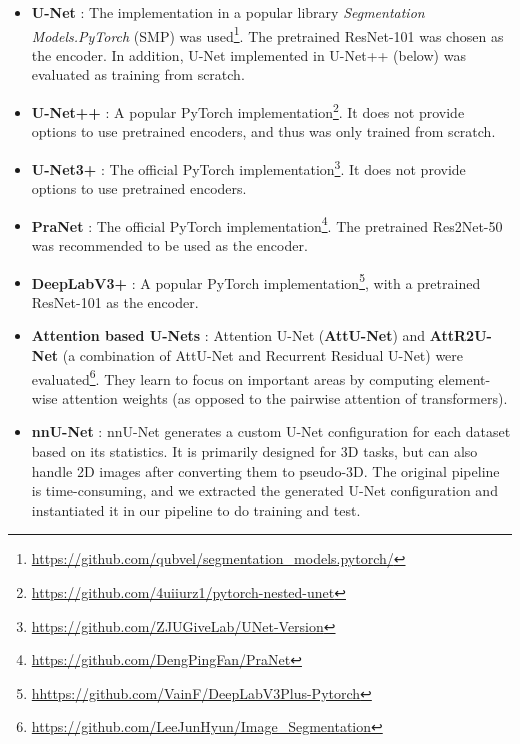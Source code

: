 \documentclass{article}
\begin{document}
\begin{itemize}
    \item \textbf{U-Net} \cite{unet}: The implementation in a popular library \emph{Segmentation Models.PyTorch} (SMP) was used\footnote{\url{https://github.com/qubvel/segmentation_models.pytorch/}}. The pretrained ResNet-101 was chosen as the encoder. In addition, U-Net implemented in U-Net++ (below) was evaluated as training from scratch. 
    
    \item \textbf{U-Net++} \cite{unet++}: A popular PyTorch implementation\footnote{\url{https://github.com/4uiiurz1/pytorch-nested-unet}}. It does not provide options to use pretrained encoders, and thus was only trained from scratch.
    
    \item \textbf{U-Net3+} \cite{unet3+}: The official PyTorch implementation\footnote{\url{https://github.com/ZJUGiveLab/UNet-Version}}. It does not provide options to use pretrained encoders.
    
    \item \textbf{PraNet} \cite{pranet}: The official PyTorch implementation\footnote{\url{https://github.com/DengPingFan/PraNet}}. The pretrained Res2Net-50 \cite{res2net} was recommended to be used as the encoder.
    
    \item \textbf{DeepLabV3+} \cite{deeplabv3+}: A popular PyTorch implementation\footnote{\url{hhttps://github.com/VainF/DeepLabV3Plus-Pytorch}}, with a pretrained ResNet-101 as the encoder.
    
    \item \textbf{Attention based U-Nets} \cite{att-unet}: Attention U-Net (\textbf{AttU-Net}) and \textbf{AttR2U-Net} (a combination of AttU-Net and Recurrent Residual U-Net) were evaluated\footnote{\url{https://github.com/LeeJunHyun/Image_Segmentation}}. They learn to focus on important areas by computing element-wise attention weights (as opposed to the pairwise attention of transformers).
    
    \item \textbf{nnU-Net} \cite{nnunet}: nnU-Net generates a custom U-Net configuration for each dataset based on its statistics. It is primarily designed for 3D tasks, but can also handle 2D images after converting them to pseudo-3D. The original pipeline is time-consuming, and we extracted the generated U-Net configuration and instantiated it in our pipeline to do training and test.
    

\end{itemize}
\end{document}
